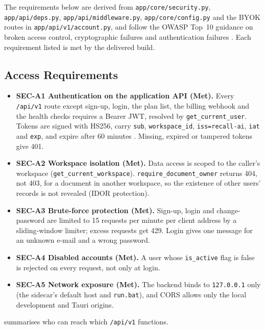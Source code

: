 The requirements below are derived from \texttt{app/core/\allowbreak{}security.py}, \texttt{app/api/\allowbreak{}deps.py},
\texttt{app/api/\allowbreak{}middleware.py}, \texttt{app/core/\allowbreak{}config.py} and the BYOK routes in
\texttt{app/api/v1/\allowbreak{}account.py}, and follow the OWASP Top~10 guidance on broken access control,
cryptographic failures and authentication failures \cite{owasp2021}. Each requirement listed is
met by the delivered build.

\subsection{Access Requirements}

\begin{itemize}
  \item \textbf{SEC-A1 Authentication on the application API (Met).} Every \texttt{/api/v1}
  route except sign-up, login, the plan list, the billing webhook and the health checks requires
  a Bearer JWT, resolved by \texttt{get\_current\_user}. Tokens are signed with HS256, carry
  \texttt{sub}, \texttt{workspace\_id}, \texttt{iss=recall-ai}, \texttt{iat} and \texttt{exp},
  and expire after 60 minutes \cite{rfc7519}. Missing, expired or tampered tokens give 401.
  \item \textbf{SEC-A2 Workspace isolation (Met).} Data access is scoped to the caller's
  workspace (\texttt{get\_current\_workspace}). \texttt{require\_document\_owner} returns 404, not
  403, for a document in another workspace, so the existence of other users' records is not
  revealed (IDOR protection).
  \item \textbf{SEC-A3 Brute-force protection (Met).} Sign-up, login and change-password are
  limited to 15 requests per minute per client address by a sliding-window limiter; excess
  requests get 429. Login gives one message for an unknown e-mail and a wrong password.
  \item \textbf{SEC-A4 Disabled accounts (Met).} A user whose \texttt{is\_active} flag is false is
  rejected on every request, not only at login.
  \item \textbf{SEC-A5 Network exposure (Met).} The backend binds to \texttt{127.0.0.1} only (the
  sidecar's default host and \texttt{run.bat}), and CORS allows only the local development and
  Tauri origins.
\end{itemize}

 summarises who can reach which \texttt{/api/v1} functions.

